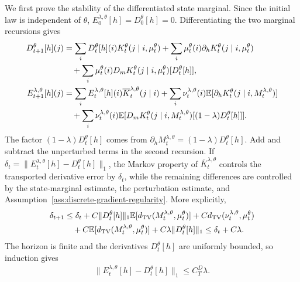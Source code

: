 We first prove the stability of the differentiated state marginal. Since the initial law is independent of $\theta$, $E_0^{\lambda,\theta}[h]=D_0^\theta[h]=0$. Differentiating the two marginal recursions gives
\begin{align}
    D_{t+1}^\theta[h](j)
    &=
    \sum_iD_t^\theta[h](i)K_t^\theta(j\mid i,\mu_t^\theta)
    +
    \sum_i\mu_t^\theta(i)\partial_hK_t^\theta(j\mid i,\mu_t^\theta)\\
    &\quad+
    \sum_i\mu_t^\theta(i)D_mK_t^\theta(j\mid i,\mu_t^\theta)[D_t^\theta[h]],\\
    E_{t+1}^{\lambda,\theta}[h](j)
    &=
    \sum_iE_t^{\lambda,\theta}[h](i)\overline K_t^{\lambda,\theta}(j\mid i)
    +
    \sum_i\nu_t^{\lambda,\theta}(i)\mathbb{E}[\partial_hK_t^\theta(j\mid i,M_t^{\lambda,\theta})]\\
    &\quad+
    \sum_i\nu_t^{\lambda,\theta}(i)
    \mathbb{E}[D_mK_t^\theta(j\mid i,M_t^{\lambda,\theta})[(1-\lambda)D_t^\theta[h]]].
\end{align}
The factor $(1-\lambda)D_t^\theta[h]$ comes from $\partial_hM_t^{\lambda,\theta}=(1-\lambda)D_t^\theta[h]$. Add and subtract the unperturbed terms in the second recursion. If $\delta_t=\|E_t^{\lambda,\theta}[h]-D_t^\theta[h]\|_1$, the Markov property of $\overline K_t^{\lambda,\theta}$ controls the transported derivative error by $\delta_t$, while the remaining differences are controlled by the state-marginal estimate, the perturbation estimate, and Assumption~\ref{ass:discrete-gradient-regularity}. More explicitly,
\begin{align}
    \delta_{t+1}
    &\leq
    \delta_t
    +
    C\|D_t^\theta[h]\|_1\mathbb{E}[d_\mathrm{TV}(M_t^{\lambda,\theta},\mu_t^\theta)]
    +
    C d_\mathrm{TV}(\nu_t^{\lambda,\theta},\mu_t^\theta)\\
    &\quad+
    C\mathbb{E}[d_\mathrm{TV}(M_t^{\lambda,\theta},\mu_t^\theta)]
    +
    C\lambda\|D_t^\theta[h]\|_1
    \leq
    \delta_t+C\lambda.
\end{align}
The horizon is finite and the derivatives $D_t^\theta[h]$ are uniformly bounded, so induction gives
\begin{align}
    \|E_t^{\lambda,\theta}[h]-D_t^\theta[h]\|_1
    \leq
    C_T^D\lambda.
\end{align}

